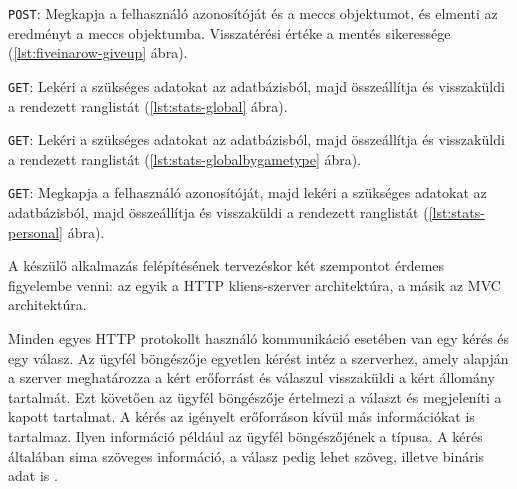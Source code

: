 

\texttt{POST}: Megkapja a felhasználó azonosítóját és a meccs objektumot, és elmenti az eredményt a meccs objektumba. Visszatérési értéke a mentés sikeressége (\ref{lst:fiveinarow-giveup} ábra).




\texttt{GET}: Lekéri a szükséges adatokat az adatbázisból, majd összeállítja és visszaküldi a rendezett ranglistát (\ref{lst:stats-global} ábra).



\texttt{GET}: Lekéri a szükséges adatokat az adatbázisból, majd összeállítja és visszaküldi a rendezett ranglistát (\ref{lst:stats-globalbygametype} ábra).



\texttt{GET}: Megkapja a felhasználó azonosítóját, majd lekéri a szükséges adatokat az adatbázisból, majd összeállítja és visszaküldi a rendezett ranglistát (\ref{lst:stats-personal} ábra).





A készülő alkalmazás felépítésének tervezéskor két szempontot érdemes figyelembe venni: az egyik a HTTP kliens-szerver architektúra, a másik az MVC architektúra.

Minden egyes HTTP protokollt használó kommunikáció esetében van egy kérés és egy válasz. Az ügyfél böngészője egyetlen kérést intéz a szerverhez, amely alapján a szerver meghatározza a kért erőforrást és válaszul visszaküldi a kért állomány tartalmát. Ezt követően az ügyfél böngészője értelmezi a választ és megjeleníti a kapott tartalmat. A kérés az igényelt erőforráson kívül más információkat is tartalmaz. Ilyen információ például az ügyfél böngészőjének a típusa. A kérés általában sima szöveges információ, a válasz pedig lehet szöveg, illetve bináris adat is \cite{java-web-tech}.

